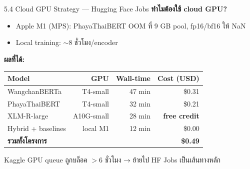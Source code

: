 \documentclass[aspectratio=169,11pt,xcolor=dvipsnames]{beamer}
\newcommand{\hl}[1]{\textcolor{kmitlOrange}{\textbf{#1}}}
\begin{document}
\begin{frame}{5.4 Cloud GPU Strategy — Hugging Face Jobs}
  \textbf{ทำไมต้องใช้ cloud GPU?}
  \begin{itemize}
    \item Apple M1 (MPS): PhayaThaiBERT OOM ที่ 9 GB pool, fp16/bf16 ให้ NaN
    \item Local training: $\sim$8 ชั่วโมง/encoder
  \end{itemize}
  \vspace{0.4em}
  \textbf{ผลที่ได้:}
  \begin{center}
    \begin{tabular}{lrrr}
      \toprule
      \textbf{Model} & \textbf{GPU} & \textbf{Wall-time} & \textbf{Cost (USD)}\\
      \midrule
      WangchanBERTa & T4-small  & 47 min & \$0.31\\
      PhayaThaiBERT & T4-small  & 32 min & \$0.21\\
      XLM-R-large   & A10G-small & 28 min & \hl{free credit}\\
      Hybrid + baselines & local M1 & 12 min & \$0.00\\
      \midrule
      \textbf{รวมทั้งโครงการ} & & & \hl{\$0.49}\\
      \bottomrule
    \end{tabular}
  \end{center}
  \vspace{0.4em}
  \begin{center}
    \scriptsize Kaggle GPU queue ถูกบล็อค $>$6 ชั่วโมง → ย้ายไป HF Jobs เป็นเส้นทางหลัก
  \end{center}
\end{frame}
\end{document}
